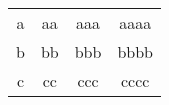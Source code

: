 \begin{table}[h!]  
  \begin{tabular}{|c|c|c|c|}
   \hline
   a & aa & aaa & aaaa\\
   \cline{2-4}
   b & bb & bbb & bbbb\\
   \cline{3-4}
   c & cc & ccc & cccc\\
   \hline
  \end{tabular}
\end{table}
